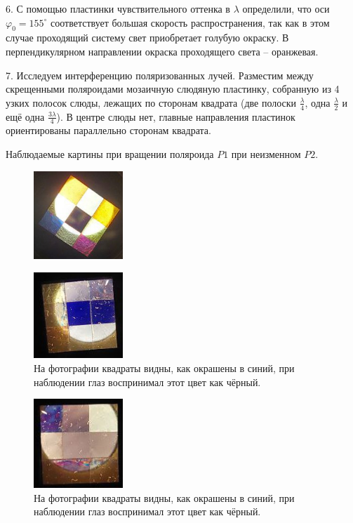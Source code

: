 6. С помощью пластинки чувствительного оттенка в $\lambda$ определили, что оси $\varphi_0 = 155^\circ$ соответствует большая скорость распространения, так как в этом случае проходящий систему свет приобретает голубую окраску. В перпендикулярном направлении окраска проходящего света -- оранжевая.

7. Исследуем интерференцию поляризованных лучей. Разместим между скрещенными поляроидами мозаичную слюдяную пластинку, собранную из 4 узких полосок слюды, лежащих по сторонам квадрата (две полоски $\frac{\lambda}{4}$, одна $\frac{\lambda}{2}$ и ещё одна $\frac{3\lambda}{4}$). В центре слюды нет, главные направления пластинок ориентированы параллельно сторонам квадрата.

Наблюдаемые картины при вращении поляроида $P1$ при неизменном $P2$.

\begin{figure}
	\centering
	\includegraphics[width=0.3\textwidth]{../Изображения/1.jpg}
\end{figure}

\begin{figure}
	\centering
	\includegraphics[width=0.3\textwidth]{../Изображения/2.jpg}
	\caption{На фотографии квадраты видны, как окрашены в синий, при наблюдении глаз воспринимал этот цвет как чёрный.}
\end{figure}

\begin{figure}
	\centering
	\includegraphics[width=0.3\textwidth]{../Изображения/3.jpg}
	\caption{На фотографии квадраты видны, как окрашены в синий, при наблюдении глаз воспринимал этот цвет как чёрный.}
\end{figure}

